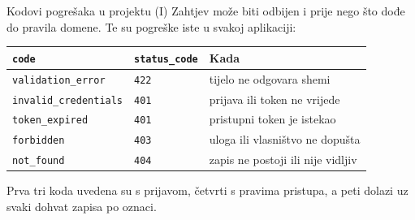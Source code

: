 \begin{frame}{Kodovi pogrešaka u projektu (I)}
Zahtjev može biti odbijen i prije nego što dođe do pravila domene. Te su pogreške iste u svakoj aplikaciji:

\vspace{0.6em}
\begin{center}
{\small
\setlength{\tabcolsep}{3pt}
\renewcommand{\arraystretch}{1.4}
\begin{tabular}{@{}L{3.8cm}L{2.3cm}L{4.9cm}@{}}
  \toprule
  \textbf{\texttt{code}} & \textbf{\texttt{status\_code}} & \textbf{Kada} \\
  \midrule
  \texttt{validation\_error}    & \texttt{422} & tijelo ne odgovara shemi \\
  \texttt{invalid\_credentials} & \texttt{401} & prijava ili token ne vrijede \\
  \texttt{token\_expired}       & \texttt{401} & pristupni token je istekao \\
  \texttt{forbidden}            & \texttt{403} & uloga ili vlasništvo ne dopušta \\
  \texttt{not\_found}           & \texttt{404} & zapis ne postoji ili nije vidljiv \\
  \bottomrule
\end{tabular}
}
\end{center}

\vspace{0.6em}
Prva tri koda uvedena su s prijavom, četvrti s pravima pristupa, a peti dolazi uz svaki dohvat zapisa po oznaci.
\end{frame}

